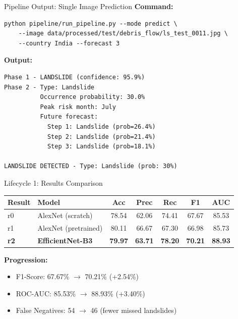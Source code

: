 \documentclass[aspectratio=169]{beamer}
\begin{document}
\begin{frame}[fragile]{Pipeline Output: Single Image Prediction}
    \textbf{Command:}
    \begin{verbatim}
python pipeline/run_pipeline.py --mode predict \
    --image data/processed/test/debris_flow/ls_test_0011.jpg \
    --country India --forecast 3
    \end{verbatim}

    \textbf{Output:}
    \begin{verbatim}
Phase 1 - LANDSLIDE (confidence: 95.9%)
Phase 2 - Type: Landslide
          Occurrence probability: 30.0%
          Peak risk month: July
          Future forecast:
            Step 1: Landslide (prob=26.4%)
            Step 2: Landslide (prob=21.4%)
            Step 3: Landslide (prob=18.1%)

LANDSLIDE DETECTED - Type: Landslide (prob: 30%)
    \end{verbatim}
\end{frame}

\begin{frame}{Lifecycle 1: Results Comparison}
    \begin{table}
        \centering
        \renewcommand{\arraystretch}{1.3}
        \begin{tabular}{llccccc}
            \toprule
            \textbf{Result} & \textbf{Model} & \textbf{Acc} & \textbf{Prec} & \textbf{Rec} & \textbf{F1} & \textbf{AUC} \\
            \midrule
            r0 & AlexNet (scratch) & 78.54 & 62.06 & 74.41 & 67.67 & 85.53 \\
            r1 & AlexNet (pretrained) & 80.11 & 66.67 & 67.30 & 66.98 & 85.73 \\
            \textbf{r2} & \textbf{EfficientNet-B3} & \textbf{79.97} & \textbf{63.71} & \textbf{78.20} & \textbf{70.21} & \textbf{88.93} \\
            \bottomrule
        \end{tabular}
    \end{table}

    \vspace{0.3cm}
    \textbf{Progression:}
    \begin{itemize}
        \item F1-Score: 67.67\% $\to$ 70.21\% (+2.54\%)
        \item ROC-AUC: 85.53\% $\to$ 88.93\% (+3.40\%)
        \item False Negatives: 54 $\to$ 46 (fewer missed landslides)
    \end{itemize}
\end{frame}
\end{document}
